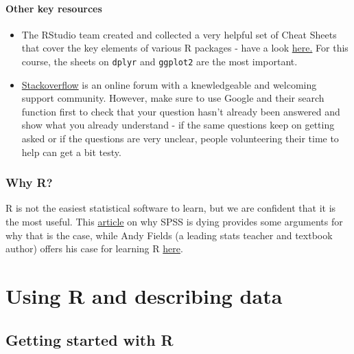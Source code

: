 \documentclass[
]{book}
\providecommand{\tightlist}{%
  \setlength{\itemsep}{0pt}\setlength{\parskip}{0pt}}
\begin{document}
\hypertarget{other-key-resources}{%
\subsection{Other key resources}\label{other-key-resources}}

\begin{itemize}
\tightlist
\item
  The RStudio team created and collected a very helpful set of Cheat Sheets that cover the key elements of various R packages - have a look \href{https://rstudio.com/resources/cheatsheets/}{here.} For this course, the sheets on \texttt{dplyr} and \texttt{ggplot2} are the most important.
\item
  \href{https://stackoverflow.com/questions/tagged/r}{Stackoverflow} is an online forum with a knewledgeable and welcoming support community. However, make sure to use Google and their search function first to check that your question hasn't already been answered and show what you already understand - if the same questions keep on getting asked or if the questions are very unclear, people volunteering their time to help can get a bit testy.
\end{itemize}

\hypertarget{why-r}{%
\section{Why R?}\label{why-r}}

R is not the easiest statistical software to learn, but we are confident that it is the most useful. This \href{https://lindeloev.net/spss-is-dying/}{article} on why SPSS is dying provides some arguments for why that is the case, while Andy Fields (a leading stats teacher and textbook author) offers his case for learning R \href{https://padlet-uploads.storage.googleapis.com/290004173/0ce387ac71c38e2643953a2148c0cd81/why_r.html}{here}.

\hypertarget{part-using-r-and-describing-data}{%
\part*{Using R and describing data}\label{part-using-r-and-describing-data}}

\hypertarget{getting-started-with-r}{%
\chapter{Getting started with R}\label{getting-started-with-r}}
\end{document}
